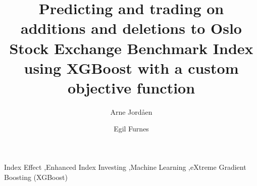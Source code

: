 
\begin{frontmatter}

\title{Predicting and trading on additions and deletions to Oslo Stock Exchange Benchmark Index using XGBoost with a custom objective function}

\author[first]{Arne Jordåen}
\author[first]{Egil Furnes}

%

\begin{abstract}
    
\end{abstract}

\begin{keyword}
Index Effect \sep Enhanced Index Investing \sep Machine Learning \sep eXtreme Gradient Boosting (XGBoost) 
\end{keyword}

\end{frontmatter}